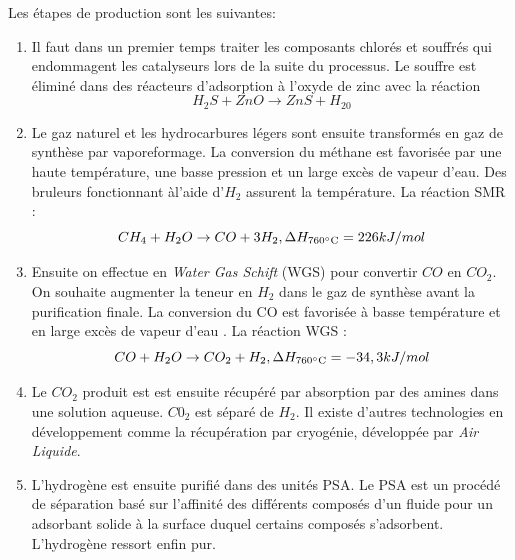 \documentclass[11pt,french,a4paper]{article}
\begin{document}
Les étapes de production sont les suivantes:
\begin{enumerate}
\item Il faut dans un premier temps traiter les composants chlorés et souffrés qui endommagent les catalyseurs lors de la suite du processus. Le souffre est éliminé dans des réacteurs d’adsorption à l’oxyde de zinc \cite{Prod_gaz_synth}
 avec la réaction $$ H_2S + ZnO \rightarrow ZnS + H_20 $$ 

\item Le gaz naturel et les hydrocarbures légers sont ensuite transformés en gaz de synthèse par vaporeformage. La conversion du méthane est favorisée par une haute température, une basse pression et un large excès de vapeur d’eau. Des bruleurs fonctionnant àl'aide d'$H_2$ assurent la température. La réaction SMR : $$ CH_4 + H_2O \rightarrow CO + 3H_2 , \Delta H_{760\celsius}=226kJ/mol$$

\item Ensuite on effectue en \emph{Water Gas Schift} (WGS) pour convertir $CO$ en $CO_2$. On souhaite augmenter la teneur en $H_2$ dans le gaz de synthèse avant la purification finale. La conversion du CO est favorisée à basse température et en large excès de vapeur d’eau \cite{Prod_gaz_synth}. La réaction WGS : $$ CO + H_2O \rightarrow CO_2 + H_2 , \Delta H_{760\celsius} =-34,3kJ/mol$$

\item Le $CO_2$ produit est est ensuite récupéré par absorption par des amines dans une solution aqueuse. $C0_2$ est séparé de $H_2$. Il existe d'autres technologies en développement comme la récupération par cryogénie, développée par \emph{Air Liquide}.

\item L'hydrogène est ensuite purifié dans des unités PSA. Le PSA est un procédé de séparation basé sur l’affinité des différents composés d’un fluide pour un adsorbant solide à la surface duquel certains composés s’adsorbent. L'hydrogène ressort enfin pur. \\

\end{enumerate}
\end{document}
